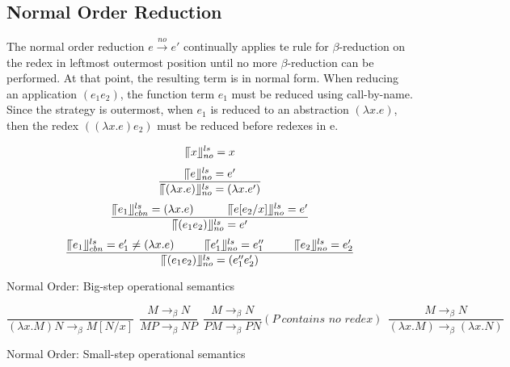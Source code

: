 \subsection{Normal Order Reduction}{\label{subsec:normal}}

The normal order reduction $e\xrightarrow{no} e'$ continually applies te rule for $\beta$-reduction on the redex in leftmost outermost position until no more $\beta$-reduction can be performed. At that point, the resulting term is in normal form. When reducing an application $(e_1e_2)$, the function term $e_1$ must be reduced using call-by-name. Since the strategy is outermost, when $e_1$ is reduced to an abstraction $(\lambda x.e)$, then the redex $((\lambda x.e)e_2)$ must be reduced before redexes in e.

\begin{equation*}
\llceil x \rrfloor ^{ls} _{no} = x
\end{equation*}
\begin{equation*}
\frac{\llceil e \rrfloor ^{ls} _{no} = e'}{\llceil (\lambda x.e) \rrfloor ^{ls} _{no} = (\lambda x.e')}
\end{equation*}
\begin{equation*}
\frac{\llceil e_1 \rrfloor ^{ls} _{cbn} = (\lambda x.e)\ \ \ \ \ \ \ \ \ \llceil e[e_2/x] \rrfloor ^{ls} _{no} = e'}{\llceil (e_1e_2) \rrfloor ^{ls} _{no} = e'}
\end{equation*}
\begin{equation*}
\frac{\llceil e_1 \rrfloor ^{ls} _{cbn} = e'_1\neq (\lambda x.e)\ \ \ \ \ \ \ \ \llceil e'_1 \rrfloor ^{ls} _{no} = e''_1\ \ \ \ \ \ \ \ \llceil e_2 \rrfloor ^{ls} _{no} = e'_2}{\llceil (e_1e_2) \rrfloor ^{ls} _{no} = (e''_1e'_2)}
\end{equation*}

\begin{center}
Normal Order: Big-step operational semantics
\end{center}

\begin{equation*}
\frac{}{(\lambda x.M)N \rightarrow _\beta M[N/x]}\ \  
\frac{M \rightarrow _\beta N}{MP \rightarrow _\beta NP}\ \ 
\frac{M \rightarrow _\beta N}{PM \rightarrow _\beta PN}(P\ \textit{contains no redex})\ \ 
\frac{M \rightarrow _\beta N}{(\lambda x.M) \rightarrow _\beta (\lambda x.N)}
\end{equation*}
\begin{center}
Normal Order: Small-step operational semantics
\end{center}

